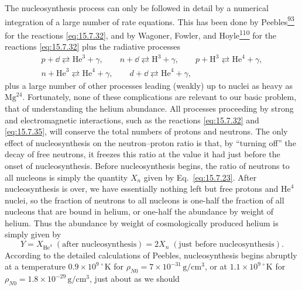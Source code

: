 The nucleosynthesis process can only be followed in detail by a numerical
integration of a large number of rate equations. This has been done by
Peebles\hyperref[ch15-ref-93]{\textsuperscript{93}} for the reactions
\eqref{eq:15.7.32}, and by Wagoner, Fowler, and
Hoyle\hyperref[ch15-ref-110]{\textsuperscript{110}} for the reactions
\eqref{eq:15.7.32} plus the radiative processes
\begin{equation}
  \begin{gathered}
    p+\dd\rightleftarrows\mathrm{He}^3+\gamma,
    \qquad
    n+\dd\rightleftarrows\mathrm H^3+\gamma,
    \qquad
    p+\mathrm H^3\rightleftarrows\mathrm{He}^4+\gamma,
    \\
    n+\mathrm{He}^3\rightleftarrows\mathrm{He}^4+\gamma,
    \qquad
    d+\dd\rightleftarrows\mathrm{He}^4+\gamma,
  \end{gathered}
  \tag{15.7.35}\label{eq:15.7.35}
\end{equation}
plus a large number of other processes leading (weakly) up to nuclei as heavy
as \(\mathrm{Mg}^{24}\). Fortunately, none of these complications are
relevant to our basic problem, that of understanding the helium abundance.
All processes proceeding by strong and electromagnetic interactions, such as
the reactions \eqref{eq:15.7.32} and \eqref{eq:15.7.35}, will conserve the
total numbers of protons and neutrons. The only effect of nucleosynthesis on
the neutron--proton ratio is that, by ``turning off'' the decay of free
neutrons, it freezes this ratio at the value it had just before the onset of
nucleosynthesis. Before nucleosynthesis begins, the ratio of neutrons to all
nucleons is simply the quantity \(X_n\) given by Eq.~\eqref{eq:15.7.23}.
After nucleosynthesis is over, we have essentially nothing left but free
protons and \(\mathrm{He}^4\) nuclei, so the fraction of neutrons to all
nucleons is one-half the fraction of all nucleons that are bound in helium,
or one-half the abundance by weight of helium. Thus the abundance by weight of
cosmologically produced helium is simply given by
\begin{equation}
  Y
  =
  X_{\mathrm{He}^4}\;(\text{after nucleosynthesis})
  =
  2X_n\;(\text{just before nucleosynthesis}).
  \tag{15.7.36}\label{eq:15.7.36}
\end{equation}
According to the detailed calculations of Peebles, nucleosynthesis begins
abruptly at a temperature \(0.9\times10^{9\,\circ}\mathrm K\) for
\(\rho_{N0}=7\times10^{-31}\,\mathrm{g/cm^3}\), or at
\(1.1\times10^{9\,\circ}\mathrm K\) for
\(\rho_{N0}=1.8\times10^{-29}\,\mathrm{g/cm^3}\), just about as we should

